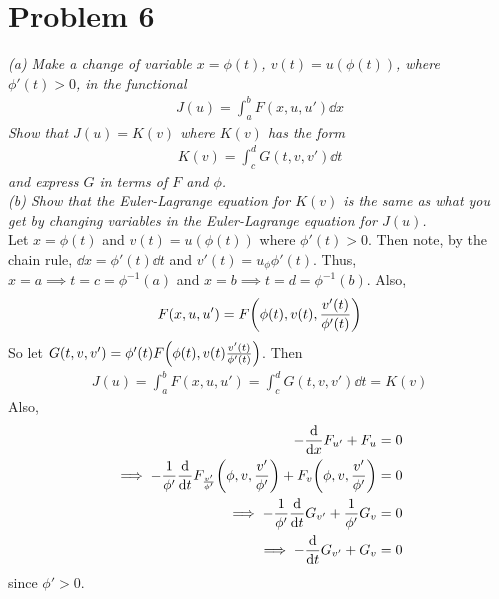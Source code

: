 \documentclass[12pt]{article}
\theoremstyle{plain}
\begin{document}
\section*{Problem 6}
\textit{(a) Make a change of variable $x = \phi(t)$, $v(t) = u(\phi(t))$, where $\phi'(t) > 0$, in the functional}
\begin{align*}
    J(u) = \int_a^b F(x, u, u')\dd x
\end{align*}
\textit{Show that $J(u) = K(v)$ where $K(v)$ has the form}
\begin{align*}
    K(v) = \int_c^d G(t, v, v')\dd t
\end{align*}
\textit{and express $G$ in terms of $F$ and $\phi$.\\
(b) Show that the Euler-Lagrange equation for $K(v)$ is the same as what you get by changing variables in the Euler-Lagrange equation for $J(u)$.} \\

Let $x = \phi(t)$ and $v(t) = u(\phi(t))$ where $\phi'(t) > 0$.  Then note, by the chain rule, $\dd x = \phi'(t) \dd t$ and $v'(t) = u_\phi \phi'(t)$.  Thus, $x = a \implies t = c = \phi^{-1}(a)$ and $x = b \implies t = d = \phi^{-1}(b)$.  Also,
\begin{align*}
    F(x, u, u') = F\qty(\phi(t), v(t), \frac{v'(t)}{\phi'(t)})
\end{align*}
So let $G(t, v, v') = \phi'(t)F\qty(\phi(t), v(t) \frac{v'(t)}{\phi'(t)})$.  Then
\begin{align*}
    J(u) = \int_a^b F(x, u, u') = \int_c^d G(t, v, v')\dd t = K(v)
\end{align*}
Also,
\begin{align*}
    -\frac{\dd}{\dd x}F_{u'} + F_u &= 0 \\
    \implies -\frac{1}{\phi'}\frac{\dd}{\dd t}F_{\frac{v'}{\phi'}}\qty(\phi, v, \frac{v'}{\phi'}) + F_v\qty(\phi, v, \frac{v'}{\phi'}) &= 0 \\
    \implies -\frac{1}{\phi'}\frac{\dd}{\dd t}G_{v'} + \frac{1}{\phi'}G_v &= 0 \\
    \implies -\frac{\dd}{\dd t}G_{v'} + G_v &= 0
\end{align*}
since $\phi' > 0$.
\end{document}
